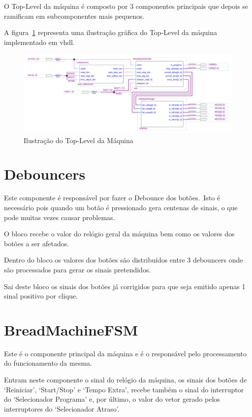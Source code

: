 O Top-Level da máquina é composto por 3 componentes principais que depois se ramificam em subcomponentes mais pequenos.

A figura~\ref{fig:top-level} representa uma ilustração gráfica do Top-Level da máquina implementado em \ac{vhdl}.

\begin{figure}[h]
    \center
    \includegraphics[scale=.25]{../images/top-level-design}\caption{Ilustração do Top-Level da Máquina}
    \label{fig:top-level}
\end{figure}

\section{Debouncers}
\label{sec:debouncers}
Este componente é responsável por fazer o Debounce dos botões.\ Isto é necessário pois quando um botão é pressionado gera centenas de sinais, o que pode muitas vezes causar problemas.

O bloco recebe o valor do relógio geral da máquina bem como os valores dos botões a ser afetados.

Dentro do bloco os valores dos botões são distribuídos entre 3 debouncers onde são processados para gerar os sinais pretendidos.

Sai deste bloco os sinais dos botões já corrigidos para que seja emitido apenas 1 sinal positivo por clique.

\section{BreadMachineFSM}
\label{sec:fsm}
Este é o componente principal da máquina e é o responsável pelo processamento do funcionamento da mesma.

Entram neste componente o sinal do relógio da máquina, os sinais dos botões de `Reiniciar', `Start/Stop' e `Tempo Extra', recebe também o sinal do interruptor do `Selecionador Programa' e, por último, o valor do vetor gerado pelos interruptores do `Selecionador Atraso'.

